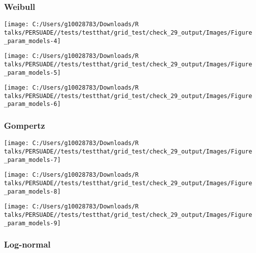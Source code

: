 \documentclass[
]{article}
\begin{document}
\subsubsection{Weibull}\label{weibull}

\begin{flushleft}\texttt{[image: C:/Users/g10028783/Downloads/R talks/PERSUADE//tests/testthat/grid\_test/check\_29\_output/Images/Figure\_param\_models-4]} \end{flushleft}

\begin{flushleft}\texttt{[image: C:/Users/g10028783/Downloads/R talks/PERSUADE//tests/testthat/grid\_test/check\_29\_output/Images/Figure\_param\_models-5]} \end{flushleft}

\begin{flushleft}\texttt{[image: C:/Users/g10028783/Downloads/R talks/PERSUADE//tests/testthat/grid\_test/check\_29\_output/Images/Figure\_param\_models-6]} \end{flushleft}

\clearpage

\subsubsection{Gompertz}\label{gompertz}

\begin{flushleft}\texttt{[image: C:/Users/g10028783/Downloads/R talks/PERSUADE//tests/testthat/grid\_test/check\_29\_output/Images/Figure\_param\_models-7]} \end{flushleft}

\begin{flushleft}\texttt{[image: C:/Users/g10028783/Downloads/R talks/PERSUADE//tests/testthat/grid\_test/check\_29\_output/Images/Figure\_param\_models-8]} \end{flushleft}

\begin{flushleft}\texttt{[image: C:/Users/g10028783/Downloads/R talks/PERSUADE//tests/testthat/grid\_test/check\_29\_output/Images/Figure\_param\_models-9]} \end{flushleft}

\clearpage

\subsubsection{Log-normal}\label{log-normal}
\end{document}

